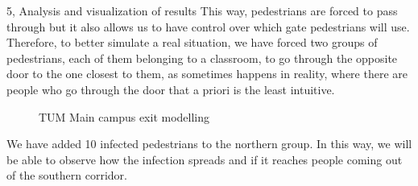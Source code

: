 \begin{task}{5, Analysis and visualization of results}
This way, pedestrians are forced to pass through but it also allows us to have control over which gate pedestrians will use. Therefore, to better simulate a real situation, we have forced two groups of pedestrians, each of them belonging to a classroom, to go through the opposite door to the one closest to them, as sometimes happens in reality, where there are people who go through the door that a priori is the least intuitive.

\begin{figure}[H]
\centering
{}
\caption{TUM Main campus exit modelling}
\label{tumscen}
\end{figure}

We have added 10 infected pedestrians to the northern group. In this way, we will be able to observe how the infection spreads and if it reaches people coming out of the southern corridor.


\end{task}

